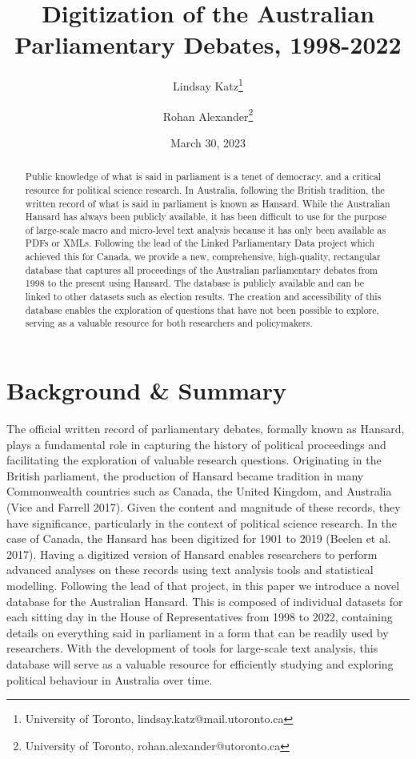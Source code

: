 \documentclass[
  letterpaper,
  DIV=11,
  numbers=noendperiod]{scrartcl}
\title{Digitization of the Australian Parliamentary Debates, 1998-2022}
\author{Lindsay Katz\footnote{University of Toronto,
  lindsay.katz@mail.utoronto.ca} \and Rohan Alexander\footnote{University
  of Toronto, rohan.alexander@utoronto.ca}}
\date{March 30, 2023}
\begin{document}
\maketitle
\begin{abstract}
Public knowledge of what is said in parliament is a tenet of democracy,
and a critical resource for political science research. In Australia,
following the British tradition, the written record of what is said in
parliament is known as Hansard. While the Australian Hansard has always
been publicly available, it has been difficult to use for the purpose of
large-scale macro and micro-level text analysis because it has only been
available as PDFs or XMLs. Following the lead of the Linked
Parliamentary Data project which achieved this for Canada, we provide a
new, comprehensive, high-quality, rectangular database that captures all
proceedings of the Australian parliamentary debates from 1998 to the
present using Hansard. The database is publicly available and can be
linked to other datasets such as election results. The creation and
accessibility of this database enables the exploration of questions that
have not been possible to explore, serving as a valuable resource for
both researchers and policymakers.
\end{abstract}
\ifdefined\Shaded\renewenvironment{Shaded}{\begin{tcolorbox}[enhanced, interior hidden, sharp corners, borderline west={3pt}{0pt}{shadecolor}, breakable, frame hidden, boxrule=0pt]}{\end{tcolorbox}}\fi

\hypertarget{sec-intro}{%
\section{Background \& Summary}\label{sec-intro}}

The official written record of parliamentary debates, formally known as
Hansard, plays a fundamental role in capturing the history of political
proceedings and facilitating the exploration of valuable research
questions. Originating in the British parliament, the production of
Hansard became tradition in many Commonwealth countries such as Canada,
the United Kingdom, and Australia (Vice and Farrell 2017). Given the
content and magnitude of these records, they have significance,
particularly in the context of political science research. In the case
of Canada, the Hansard has been digitized for 1901 to 2019 (Beelen et
al. 2017). Having a digitized version of Hansard enables researchers to
perform advanced analyses on these records using text analysis tools and
statistical modelling. Following the lead of that project, in this paper
we introduce a novel database for the Australian Hansard. This is
composed of individual datasets for each sitting day in the House of
Representatives from 1998 to 2022, containing details on everything said
in parliament in a form that can be readily used by researchers. With
the development of tools for large-scale text analysis, this database
will serve as a valuable resource for efficiently studying and exploring
political behaviour in Australia over time.
\end{document}
